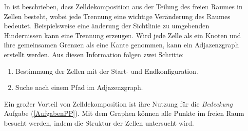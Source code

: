 In \cite{Principles:05} ist beschrieben, dass Zelldekomposition aus der Teilung des freien Raumes in Zellen besteht, wobei jede Trennung eine wichtige Veränderung des Raumes bedeutet. Beispielsweise eine änderung der Sichtlinie zu umgebenden Hindernissen kann eine Trennung erzeugen. Wird jede Zelle als ein Knoten und ihre gemeinsamen Grenzen als eine Kante genommen, kann ein Adjazenzgraph erstellt werden. 
Aus diesen Information folgen zwei Schritte: 
\begin{enumerate}
	\item Bestimmung der Zellen mit der Start- und Endkonfiguration. 
	\item Suche nach einem Pfad im Adjazenzgraph.
\end{enumerate}
Ein gro{ß}er Vorteil von Zelldekomposition ist ihre Nutzung für die \textit{Bedeckung} Aufgabe (\ref{AufgabenPP}). Mit dem Graphen können alle Punkte im freien Raum besucht werden, indem die Struktur der Zellen untersucht wird.

